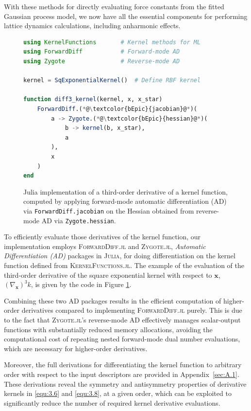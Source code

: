 With these methods for directly evaluating force constants from the fitted Gaussian process model, we now have all the essential components for performing lattice dynamics calculations, including anharmonic effects.

\begin{figure}[t]
  \centering
  \begin{lstlisting}[language=Julia]
using KernelFunctions       # Kernel methods for ML
using ForwardDiff           # Forward-mode AD 
using Zygote                # Reverse-mode AD

kernel = SqExponentialKernel()  # Define RBF kernel

function diff3_kernel(kernel, x, x_star)
    ForwardDiff.(*@\textcolor{bEpic}{jacobian}@*)(
        a -> Zygote.(*@\textcolor{bEpic}{hessian}@*)(
            b -> kernel(b, x_star),
            a
        ),
        x
    )
end
  \end{lstlisting}
  \caption{\label{fig:3.2} Julia implementation of a third-order derivative of a kernel function, computed by applying forward-mode automatic differentiation (AD) via \texttt{ForwardDiff.jacobian} on the Hessian obtained from reverse-mode AD via \texttt{Zygote.hessian}. %
  }
\end{figure}

To efficiently evaluate those derivatives of the kernel function, our implementation employs \textsc{ForwardDiff.jl} and \textsc{Zygote.jl}, \textit{Automatic Differentiation (AD)} packages in \textsc{Julia}, for doing differentiation on the kernel function defined from \textsc{KernelFunctions.jl}.
The example of the evaluation of the third-order derivative of the square exponential kernel with respect to $\mathbf{x}$, $(\nabla_{\mathbf{x}})^{3}k$, is given by the code in Figure \ref{fig:3.2}.

Combining these two AD packages results in the efficient computation of higher-order derivatives compared to implementing \textsc{ForwardDiff.jl} purely. 
This is due to the fact that \textsc{Zygote.jl}'s reverse-mode AD effectively manages scalar-output functions with substantially reduced memory allocations, avoiding the computational cost of repeating nested forward-mode dual number evaluations, which are necessary for higher-order derivatives.

Moreover, the full derivations for differentiating the kernel function to arbitrary order with respect to the input descriptors are provided in Appendix~\ref{sec:A.1}. These derivations reveal the symmetry and antisymmetry properties of derivative kernels in \eqref{equ:3.6} and \eqref{equ:3.8}, at a given order, which can be exploited to significantly reduce the number of required kernel derivative evaluations.


